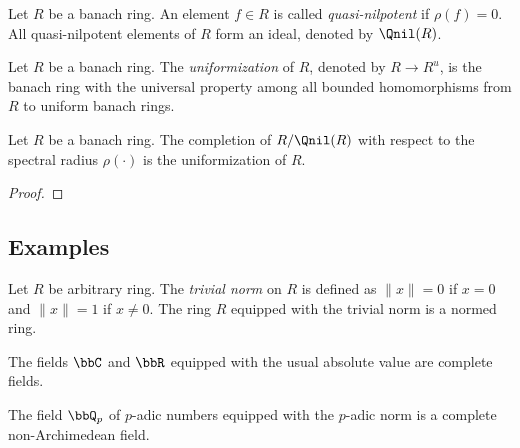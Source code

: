     \begin{definition}\label{def:quasi_nilpotent_element}
        Let \(R\) be a banach ring.
        An element \(f \in R\) is called \emph{quasi-nilpotent} if \(\rho(f) = 0\).
        All quasi-nilpotent elements of \(R\) form an ideal, denoted by \(\Qnil(R)\).
    \end{definition}

    \begin{definition}\label{def:uniformization_of_banach_rings}
        Let \(R\) be a banach ring.
        The \emph{uniformization} of \(R\), denoted by \(R \to R^u\), is the banach ring with the universal property among all bounded homomorphisms from \(R\) to uniform banach rings.
    \end{definition}

    \begin{proposition}\label{prop:the_uniformization_of_banach_rings_given_by_spectral_radius}
        Let \(R\) be a banach ring.
        The completion of \(R/\Qnil(R)\) with respect to the spectral radius \(\rho(\cdot)\) is the uniformization of \(R\).
    \end{proposition}
    \begin{proof}
    \end{proof}



\subsection{Examples}

    \begin{example}\label{eg:trivial_normed_rings}
        Let \(R\) be arbitrary ring.
        The \emph{trivial norm} on \(R\) is defined as \(\|x\| = 0\) if \(x = 0\) and \(\|x\| = 1\) if \(x \neq 0\).
        The ring \(R\) equipped with the trivial norm is a normed ring.
    \end{example}

    \begin{example}\label{eg:C_and_R_as_complete_fields}
        The fields \(\bbC\) and \(\bbR\) equipped with the usual absolute value are complete fields.
    \end{example}

    \begin{example}\label{eg:p-adic_fields_as_complete_fields}
        The field \(\bbQ_p\) of \(p\)-adic numbers equipped with the \(p\)-adic norm is a complete non-Archimedean field.
    \end{example}

